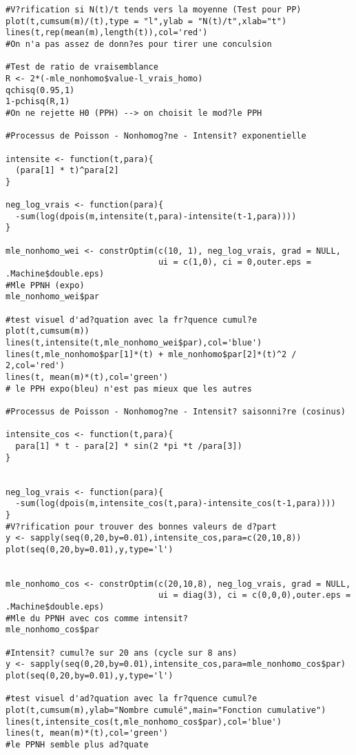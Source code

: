 \begin{verbatim}
#V?rification si N(t)/t tends vers la moyenne (Test pour PP)
plot(t,cumsum(m)/(t),type = "l",ylab = "N(t)/t",xlab="t")
lines(t,rep(mean(m),length(t)),col='red')
#On n'a pas assez de donn?es pour tirer une conculsion

#Test de ratio de vraisemblance
R <- 2*(-mle_nonhomo$value-l_vrais_homo)
qchisq(0.95,1)
1-pchisq(R,1)
#On ne rejette H0 (PPH) --> on choisit le mod?le PPH

#Processus de Poisson - Nonhomog?ne - Intensit? exponentielle

intensite <- function(t,para){
  (para[1] * t)^para[2]
}

neg_log_vrais <- function(para){
  -sum(log(dpois(m,intensite(t,para)-intensite(t-1,para))))
}

mle_nonhomo_wei <- constrOptim(c(10, 1), neg_log_vrais, grad = NULL, 
                               ui = c(1,0), ci = 0,outer.eps = .Machine$double.eps)
#Mle PPNH (expo)
mle_nonhomo_wei$par

#test visuel d'ad?quation avec la fr?quence cumul?e
plot(t,cumsum(m))
lines(t,intensite(t,mle_nonhomo_wei$par),col='blue')
lines(t,mle_nonhomo$par[1]*(t) + mle_nonhomo$par[2]*(t)^2 / 2,col='red')
lines(t, mean(m)*(t),col='green')
# le PPH expo(bleu) n'est pas mieux que les autres

#Processus de Poisson - Nonhomog?ne - Intensit? saisonni?re (cosinus)

intensite_cos <- function(t,para){
  para[1] * t - para[2] * sin(2 *pi *t /para[3])
}


neg_log_vrais <- function(para){
  -sum(log(dpois(m,intensite_cos(t,para)-intensite_cos(t-1,para))))
}
#V?rification pour trouver des bonnes valeurs de d?part
y <- sapply(seq(0,20,by=0.01),intensite_cos,para=c(20,10,8))
plot(seq(0,20,by=0.01),y,type='l')


mle_nonhomo_cos <- constrOptim(c(20,10,8), neg_log_vrais, grad = NULL, 
                               ui = diag(3), ci = c(0,0,0),outer.eps = .Machine$double.eps)
#Mle du PPNH avec cos comme intensit?
mle_nonhomo_cos$par

#Intensit? cumul?e sur 20 ans (cycle sur 8 ans)
y <- sapply(seq(0,20,by=0.01),intensite_cos,para=mle_nonhomo_cos$par)
plot(seq(0,20,by=0.01),y,type='l')

#test visuel d'ad?quation avec la fr?quence cumul?e
plot(t,cumsum(m),ylab="Nombre cumulé",main="Fonction cumulative")
lines(t,intensite_cos(t,mle_nonhomo_cos$par),col='blue')
lines(t, mean(m)*(t),col='green')
#le PPNH semble plus ad?quate


\end{verbatim}
